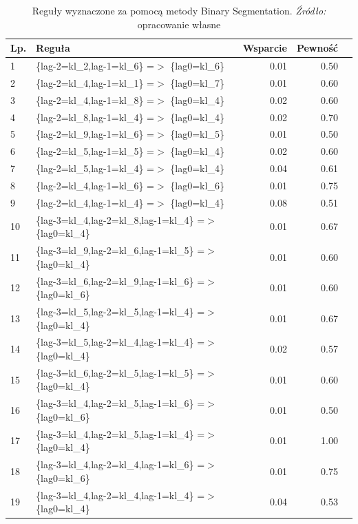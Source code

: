 \documentclass[polish, twoside, 12pt, a4paper]{article}
\theoremstyle{definition}
\theoremstyle{plain}
\theoremstyle{remark}
\begin{document}
\begin{table}[H]
\caption{Reguły wyznaczone za pomocą metody Binary Segmentation. \textit{Źródło:} opracowanie własne}
\label{tab005}
\begin{tabular}{llrrr}
Lp. & Reguła & Wsparcie & Pewność  \\ 
  \hline
1 & \{lag-2=kl\_2,lag-1=kl\_6\} =$>$ \{lag0=kl\_6\} & 0.01 & 0.50  \\ 
2 & \{lag-2=kl\_4,lag-1=kl\_1\} =$>$ \{lag0=kl\_7\} & 0.01 & 0.60  \\ 
3 & \{lag-2=kl\_4,lag-1=kl\_8\} =$>$ \{lag0=kl\_4\} & 0.02 & 0.60  \\ 
4 & \{lag-2=kl\_8,lag-1=kl\_4\} =$>$ \{lag0=kl\_4\} & 0.02 & 0.70  \\ 
5 & \{lag-2=kl\_9,lag-1=kl\_6\} =$>$ \{lag0=kl\_5\} & 0.01 & 0.50  \\ 
6 & \{lag-2=kl\_5,lag-1=kl\_5\} =$>$ \{lag0=kl\_4\} & 0.02 & 0.60  \\ 
7 & \{lag-2=kl\_5,lag-1=kl\_4\} =$>$ \{lag0=kl\_4\} & 0.04 & 0.61  \\ 
8 & \{lag-2=kl\_4,lag-1=kl\_6\} =$>$ \{lag0=kl\_6\} & 0.01 & 0.75  \\ 
9 & \{lag-2=kl\_4,lag-1=kl\_4\} =$>$ \{lag0=kl\_4\} & 0.08 & 0.51  \\ 
10 & \{lag-3=kl\_4,lag-2=kl\_8,lag-1=kl\_4\} =$>$ \{lag0=kl\_4\} & 0.01 & 0.67 \\ 
11 & \{lag-3=kl\_9,lag-2=kl\_6,lag-1=kl\_5\} =$>$ \{lag0=kl\_4\} & 0.01 & 0.60 \\ 
12 & \{lag-3=kl\_6,lag-2=kl\_9,lag-1=kl\_6\} =$>$ \{lag0=kl\_6\} & 0.01 & 0.60 \\ 
13 & \{lag-3=kl\_5,lag-2=kl\_5,lag-1=kl\_4\} =$>$ \{lag0=kl\_4\} & 0.01 & 0.67 \\ 
14 & \{lag-3=kl\_5,lag-2=kl\_4,lag-1=kl\_4\} =$>$ \{lag0=kl\_4\} & 0.02 & 0.57 \\ 
15 & \{lag-3=kl\_6,lag-2=kl\_5,lag-1=kl\_5\} =$>$ \{lag0=kl\_4\} & 0.01 & 0.60 \\ 
16 & \{lag-3=kl\_4,lag-2=kl\_5,lag-1=kl\_6\} =$>$ \{lag0=kl\_6\} & 0.01 & 0.50 \\ 
17 & \{lag-3=kl\_4,lag-2=kl\_5,lag-1=kl\_4\} =$>$ \{lag0=kl\_4\} & 0.01 & 1.00 \\ 
18 & \{lag-3=kl\_4,lag-2=kl\_4,lag-1=kl\_6\} =$>$ \{lag0=kl\_6\} & 0.01 & 0.75 \\ 
19 & \{lag-3=kl\_4,lag-2=kl\_4,lag-1=kl\_4\} =$>$ \{lag0=kl\_4\} & 0.04 & 0.53
\end{tabular}
\end{table}
\end{document}
